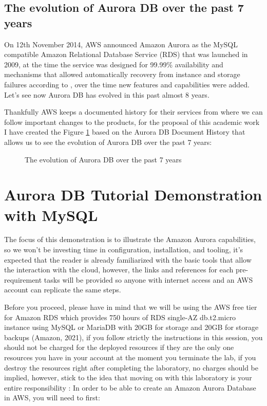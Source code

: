 \documentclass{article}
\begin{document}
\subsection{The evolution of Aurora DB over the past 7 years }

On 12th November 2014, AWS announced Amazon Aurora as the MySQL compatible Amazon Relational Database Service (RDS) that was launched in 2009, at the time the service was designed for 99.99\% availability and mechanisms that allowed automatically recovery from instance and storage failures according to \cite{jeffbarr2014}, over the time new features and capabilities were added. Let’s see now Aurora DB has evolved in this past almost 8 years. 

Thankfully AWS keeps a documented history for their services from where we can follow important changes to the products, for the proposal of this academic work I have created the Figure \ref{fig:AmazonAuroraOverTheYears} based on the Aurora DB Document History \cite{awsdocumentedhistory} that allows us to see the evolution of Aurora DB over the past 7 years:

\begin{figure}[hbt!]
\centering
\caption{\label{fig:AmazonAuroraOverTheYears}The evolution of Aurora DB over the past 7 years }
\end{figure}
\clearpage

\section{Aurora DB Tutorial Demonstration with MySQL}

The focus of this demonstration is to illustrate the Amazon Aurora capabilities, so we won’t be investing time in configuration, installation, and tooling, it’s expected that the reader is already familiarized with the basic tools that allow the interaction with the cloud, however, the links and references for each pre-requirement tasks will be provided so anyone with internet access and an AWS account can replicate the same steps.

Before you proceed, please have in mind that we will be using the AWS free tier for Amazon RDS which provides 750 hours of RDS single-AZ db.t2.micro instance using MySQL or MariaDB with 20GB for storage and 20GB for storage backups (Amazon, 2021), if you follow strictly the instructions in this session, you should not be charged for the deployed resources if they are the only one resources you have in your account at the moment you terminate the lab, if you destroy the resources right after completing the laboratory, no charges should be implied, however, stick to the idea that moving on with this laboratory is your entire responsibility :
In order to be able to create an Amazon Aurora Database in AWS, you will need to first:
\end{document}
